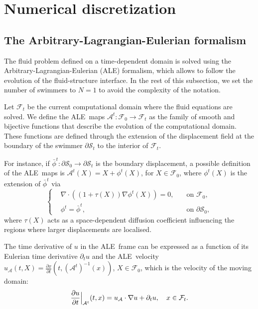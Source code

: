 \documentclass[graybox]{svmult}
\newcommand{\Fluid}{\mathcal{F}} %
\newcommand{\Alemap}{\mathcal{A}} %
\newcommand{\ALE}{ALE} %
\newcommand{\Vel}{u} %
\newcommand{\CompDomain}{\Fluid}
\begin{document}
\section{Numerical discretization}
\label{Sec:NumDiscr}

\subsection{The Arbitrary-Lagrangian-Eulerian formalism}
The fluid problem defined on a time-dependent domain is solved using the Arbitrary-Lagrangian-Eulerian (\ALE) formalism, which allows to follow the evolution of the fluid-structure interface.
In the rest of this subsection, we set the number of swimmers to $N=1$ to avoid the complexity of the notation.



Let $\CompDomain_t$ be the current computational domain where the fluid equations are solved. 
We define the \ALE\ maps $\Alemap^t:\CompDomain_0 \to \CompDomain_t$ as the family of smooth and bijective functions that describe the evolution of the computational domain. 
These functions are defined through the extension of the displacement field at the boundary of the swimmer $\partial \mathcal{S}_t$ to the interior of $\CompDomain_t$. 

For instance, if $\bar{\phi}^t:\partial \mathcal{S}_0 \to \partial \mathcal{S}_t$ is the boundary displacement, a possible definition of the \ALE\ maps is $\Alemap^t(X) = X + \phi^t(X)$, for $X \in \CompDomain_0$, where $\phi^t(X)$ is the extension of $\bar{\phi}^t$ via
\begin{equation}
	\left\{
	\begin{aligned}
		&\nabla \cdot((1+\tau(X))\nabla \phi^t(X)) = 0, \quad &\text{on $\CompDomain_0$},\\
		&\mathcal{\phi}^t= \bar{\phi}^t, &\text{on $\partial \mathcal{S}_0$},
	\end{aligned}
	\right.
 \label{Eq: VarFormALE}
\end{equation}
where $\tau(X)$ acts as a space-dependent diffusion coefficient influencing the regions where larger displacements are localised.

The time derivative of $\Vel$ in the \ALE\ frame can be expressed as a function of its Eulerian time derivative $\partial_t \Vel$ and the \ALE\ velocity $\Vel_{\mathcal{A}}(t,X)=\frac{\partial x}{\partial t}(t,(\Alemap^{t})^{-1}(x))$, $X \in \CompDomain_0$, which is the velocity of the moving domain:
\begin{equation}
\frac{\partial \Vel}{\partial t} \Big|_{\Alemap^t}(t,x)=\Vel_{\mathcal{A}} \cdot \nabla \Vel + \partial_t \Vel, \quad \text{$ x \in \CompDomain_t$}.
\end{equation}
\end{document}
